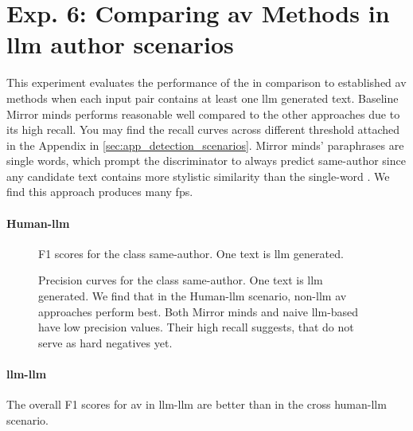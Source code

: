 \section{Exp. 6: Comparing \ac{av} Methods in \acs{llm} author scenarios}

This experiment evaluates the performance of the \impAppr{} in comparison to established \ac{av} methods when each input pair contains at least one \ac{llm} generated text.
Baseline Mirror minds performs reasonable well compared to the other approaches due to its high recall.
You may find the recall curves across different threshold attached in the Appendix in \autoref{sec:app_detection_scenarios}.
Mirror minds' paraphrases are single words, which prompt the discriminator to always predict same-author since any candidate text contains more stylistic similarity than the single-word \imps{}.
We find this approach produces many \acp{fp}.


\paragraph{Human-\ac{llm}}

  \begin{figure}[b]
    \centering
    
    \caption{F1 scores for the class same-author.
  One text is \ac{llm} generated.}
    \label{fig:human-llm_f1}
  \end{figure}

  \begin{figure}[b]
    
  \caption{Precision curves for the class same-author. 
  One text is \ac{llm} generated.
  We find that in the Human-\ac{llm} scenario, non-\ac{llm} \ac{av} approaches perform best. 
  Both Mirror minds and naive \ac{llm}-based have low precision values.
  Their high recall suggests, that \imps{} do not serve as hard negatives yet.}
  \label{fig:human-llm_prec}
\end{figure}





\paragraph{\ac{llm}-\ac{llm}}
The overall F1 scores for \ac{av} in \ac{llm}-\ac{llm} are better than in the cross human-\ac{llm} scenario.


